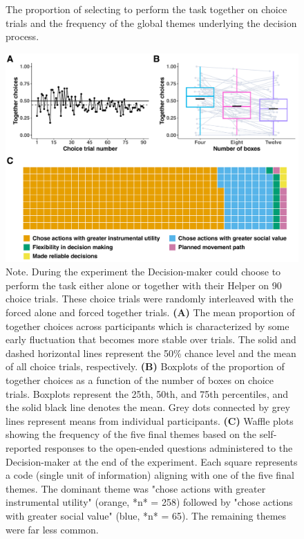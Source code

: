 \documentclass[
  man,
  floatsintext,
  longtable,
  nolmodern,
  notxfonts,
  notimes,
  colorlinks=true,linkcolor=blue,citecolor=blue,urlcolor=blue]{apa7}
\begin{document}
\begin{figure}[htbp]
\caption{The proportion of selecting to perform the task together on choice trials and the frequency of the global themes underlying the decision process.}
\centering
\includegraphics[scale=0.675]{../../figs/fig2.pdf}
\setlength{\belowcaptionskip}{-2em}
\caption*{\singlespacing \small Note. \normalfont During the experiment the Decision-maker could choose to perform the task either alone or together with their Helper on 90 choice trials. These choice trials were randomly interleaved with the forced alone and forced together trials. \textbf{(A)} The mean proportion of together choices across participants which is characterized by some early fluctuation that becomes more stable over trials. The solid and dashed horizontal lines represent the 50\% chance level and the mean of all choice trials, respectively. \textbf{(B)} Boxplots of the proportion of together choices as a function of the number of boxes on choice trials. Boxplots represent the 25th, 50th, and 75th percentiles, and the solid black line denotes the mean. Grey dots connected by grey lines represent means from individual participants. \textbf{(C)} Waffle plots showing the frequency of the five final themes based on the self-reported responses to the open-ended questions administered to the Decision-maker at the end of the experiment. Each square represents a code (single unit of information) aligning with one of the five final themes. The dominant theme was "chose actions with greater instrumental utility" (orange, *n* = 258) followed by "chose actions with greater social value" (blue, *n* = 65). The remaining themes were far less common.
}
\label{fig:fig2}
\end{figure}
\end{document}
